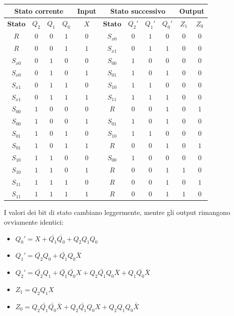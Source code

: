 \documentclass[11pt, a4paper, titlepage, oneside]{scrbook}
\begin{document}
\begin{table}[H]
  \centering
  \begin{tabular}{|c|c|c|c|c|c|c|c|c|c|c|}
    \hline
    \multicolumn{4}{|c|}{\textbf{Stato corrente}}  & \textbf{Input} & \multicolumn{4}{c|}{\textbf{Stato successivo}} & \multicolumn{2}{c|}{\textbf{Output}} \\
    \hline
    \textbf{Stato} & $Q_2$ & $Q_1$ & $Q_0$ & $X$ & \textbf{Stato} & $Q_2'$ & $Q_1'$ & $Q_0'$ & $Z_1$ & $Z_0$ \\ \hline
    $R$ & $0$ & $0$ & $1$ & $0$ & $S_{x0}$ & $0$ & $1$ & $0$ & $0$ & $0$ \\
    $R$ & $0$ & $0$ & $1$ & $1$ & $S_{x1}$ & $0$ & $1$ & $1$ & $0$ & $0$ \\
    $S_{x0}$ & $0$ & $1$ & $0$ & $0$ & $S_{00}$ & $1$ & $0$ & $0$ & $0$ & $0$ \\
    $S_{x0}$ & $0$ & $1$ & $0$ & $1$ & $S_{01}$ & $1$ & $0$ & $1$ & $0$ & $0$ \\
    $S_{x1}$ & $0$ & $1$ & $1$ & $0$ & $S_{10}$ & $1$ & $1$ & $0$ & $0$ & $0$ \\
    $S_{x1}$ & $0$ & $1$ & $1$ & $1$ & $S_{11}$ & $1$ & $1$ & $1$ & $0$ & $0$ \\
    $S_{00}$ & $1$ & $0$ & $0$ & $0$ & $R$ & $0$ & $0$ & $1$ & $0$ & $1$ \\
    $S_{00}$ & $1$ & $0$ & $0$ & $1$ & $S_{01}$ & $1$ & $0$ & $1$ & $0$ & $0$ \\
    $S_{01}$ & $1$ & $0$ & $1$ & $0$ & $S_{10}$ & $1$ & $1$ & $0$ & $0$ & $0$ \\
    $S_{01}$ & $1$ & $0$ & $1$ & $1$ & $R$ & $0$ & $0$ & $1$ & $0$ & $1$ \\
    $S_{10}$ & $1$ & $1$ & $0$ & $0$ & $S_{00}$ & $1$ & $0$ & $0$ & $0$ & $0$ \\
    $S_{10}$ & $1$ & $1$ & $0$ & $1$ & $R$ & $0$ & $0$ & $1$ & $1$ & $0$ \\
    $S_{11}$ & $1$ & $1$ & $1$ & $0$ & $R$ & $0$ & $0$ & $1$ & $0$ & $1$ \\
    $S_{11}$ & $1$ & $1$ & $1$ & $1$ & $R$ & $0$ & $0$ & $1$ & $1$ & $0$ \\
    \hline
  \end{tabular}
\end{table}

I valori dei bit di stato cambiano leggermente, mentre gli output rimangono ovviamente identici:
\begin{itemize}
    \item $Q_0' = X + \bar{Q_1} \bar{Q_0} + Q_2 Q_1 Q_0$
    \item $Q_1' = \bar{Q_2} Q_0 + \bar{Q_1} Q_0 \bar{X}$ 
    \item $Q_2' = \bar{Q_2} Q_1 + \bar{Q_1} \bar{Q_0} X + Q_2 \bar{Q_1} Q_0 \bar{X} + Q_1 \bar{Q_0} \bar{X}$
    \item $Z_1 = Q_2 Q_1 X$ 
    \item $Z_0 = Q_2 \bar{Q_1} \bar{Q_0} \bar{X} + Q_2 \bar{Q_1} Q_0 X + Q_2 Q_1 Q_0 \bar{X}$ 
\end{itemize} 
\end{document}
